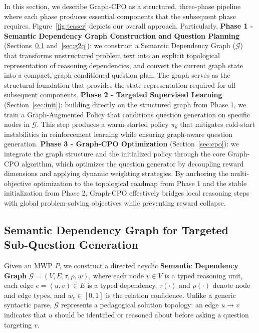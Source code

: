 \documentclass[sigconf, anonymous, review, screen]{acmart}
\begin{document}
In this section, we describe Graph-CPO as a structured, three-phase pipeline where each phase produces essential components that the subsequent phase requires. Figure~\ref{fig:teaser} depicts our overall approach. Particularly, \textbf{Phase 1 - Semantic Dependency Graph Construction and Question Planning} (Sections~\ref{sec:graph} and~\ref{sec:g2q}): we construct a Semantic Dependency Graph ($\mathcal{G}$) that transforms unstructured problem text into an explicit topological representation of reasoning dependencies, and convert the current graph state into a compact, graph-conditioned question plan. The graph serves as the structural foundation that provides the state representation required for all subsequent components.
\textbf{Phase 2 - Targeted Supervised Learning} (Section~\ref{sec:init}): building directly on the structured graph from Phase 1, we train a Graph-Augmented Policy that conditions question generation on specific nodes in $\mathcal{G}$. This step produces a warm-started policy $\pi_\theta$ that mitigates cold-start instabilities in reinforcement learning while ensuring graph-aware question generation.
\textbf{Phase 3 - Graph-CPO Optimization} (Section~\ref{sec:cpo}): we integrate the graph structure and the initialized policy through the core Graph-CPO algorithm, which optimizes the question generator by decoupling reward dimensions and applying dynamic weighting strategies. By anchoring the multi-objective optimization to the topological roadmap from Phase 1 and the stable initialization from Phase 2, Graph-CPO effectively bridges local reasoning steps with global problem-solving objectives while preventing reward collapse.

\subsection{Semantic Dependency Graph for Targeted Sub-Question Generation}
\label{sec:graph}

Given an MWP $P$, we construct a directed acyclic \textbf{Semantic Dependency Graph}
$\mathcal{G}=(V,E,\tau,\rho,w)$, where each node $v\in V$ is a typed reasoning unit, each edge
$e=(u,v)\in E$ is a typed dependency, $\tau(\cdot)$ and $\rho(\cdot)$ denote node and edge types,
and $w_e\in[0,1]$ is the relation confidence. Unlike a generic syntactic parse, $\mathcal{G}$
represents a pedagogical solution topology: an edge $u\!\rightarrow\!v$ indicates that $u$ should be
identified or reasoned about before asking a question targeting $v$.
\end{document}
